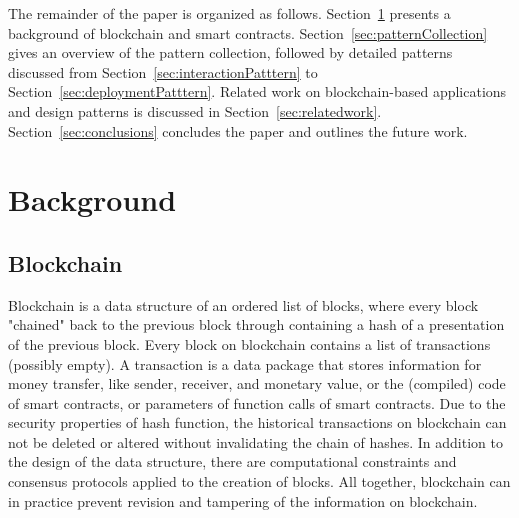 The remainder of the paper is organized as follows. Section~\ref{sec:background} presents a background of blockchain and smart contracts. Section~\ref{sec:patternCollection} gives an overview of the pattern collection, followed by detailed patterns discussed from Section~\ref{sec:interactionPatttern} to Section~\ref{sec:deploymentPatttern}. Related work on blockchain-based applications and design patterns is discussed in Section~\ref{sec:relatedwork}. Section~\ref{sec:conclusions} concludes the paper and outlines the future work.

\section{Background}
\label{sec:background}

\subsection{Blockchain}

Blockchain is a data structure of an ordered list of blocks, where every block "chained" back to the previous block through containing a hash of a presentation of the previous block. Every block on blockchain contains a list of transactions (possibly empty). A transaction is a data package that stores information for money transfer, like sender, receiver, and monetary value, or the (compiled) code of smart contracts, or parameters of function calls of smart contracts. Due to the security properties of hash function, the historical transactions on blockchain can not be deleted or altered without invalidating the chain of hashes. In addition to the design of the data structure, there are computational constraints and consensus protocols applied to the creation of blocks. All together, blockchain can in practice prevent revision and tampering of the information on blockchain. %



